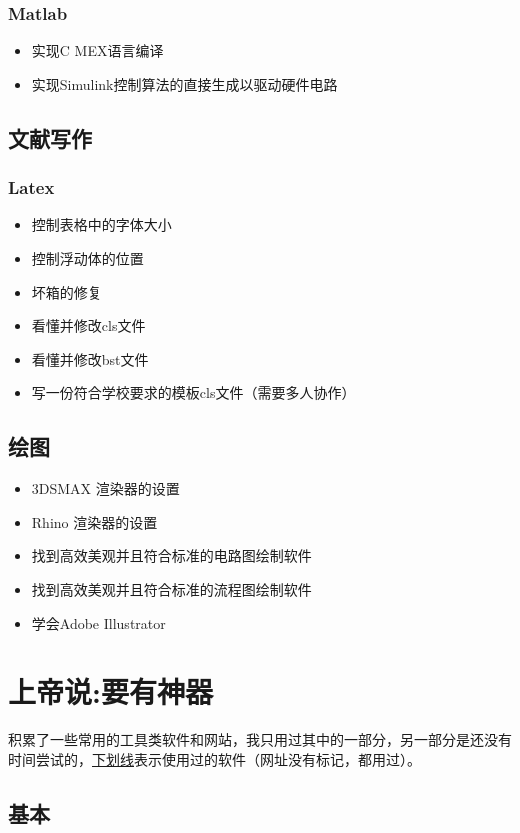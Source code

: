 \documentclass[UTF8,oneside]{ctexbook}
\begin{document}
\subsection{Matlab}
\begin{itemize}
	\item 实现C MEX语言编译
	\item 实现Simulink控制算法的直接生成以驱动硬件电路
\end{itemize}

\section{文献写作}
\subsection{Latex}
\begin{itemize}
	\item 控制表格中的字体大小
	\item 控制浮动体的位置
	\item 坏箱的修复
	\item 看懂并修改cls文件
	\item 看懂并修改bst文件
	\item 写一份符合学校要求的模板cls文件（需要多人协作）
\end{itemize}

\section{绘图}
\begin{itemize}
	\item 3DSMAX 渲染器的设置
	\item Rhino 渲染器的设置
	\item 找到高效美观并且符合标准的电路图绘制软件
	\item 找到高效美观并且符合标准的流程图绘制软件
	\item 学会Adobe Illustrator
\end{itemize}


\chapter{上帝说:要有神器}
积累了一些常用的工具类软件和网站，我只用过其中的一部分，另一部分是还没有时间尝试的，\underline{下划线}表示使用过的软件（网址没有标记，都用过）。

\section{基本}
\end{document}
